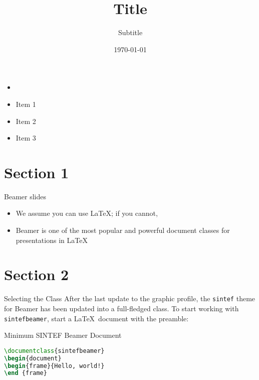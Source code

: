 \documentclass{sintefbeamer}
\title{Title}
\subtitle{Subtitle}
\author{\href{j.busink@vu.nl}{}}
\date{\today}
\begin{document}
\maketitle

\begin{frame}
\begin{itemize}
      \item {} 
      \item Item 1
      \item Item 2
      \item Item 3
\end{itemize}

\end{frame}

\section{Section 1}

\begin{frame}{Beamer slides}{\thesection \, \secname}

\begin{itemize}
\item We assume you can use \LaTeX; if you cannot,
\item Beamer is one of the most popular and powerful document
classes for presentations in \LaTeX
\end{itemize}
\end{frame}

\section{Section 2}

\begin{frame}[fragile]{Selecting the Class}
After the last update to the graphic profile, the \texttt{sintef} theme for
Beamer has been updated into a full-fledged class.
To start working with \texttt{sintefbeamer}, start a \LaTeX\ document with the
preamble:
\begin{block}{Minimum SINTEF Beamer Document}
\begin{lstlisting}[language=TeX]
\documentclass{sintefbeamer}
\begin{document}
\begin{frame}{Hello, world!}
\end {frame}
\end{lstlisting}
\end{block}
\end{frame}
\end{document}
